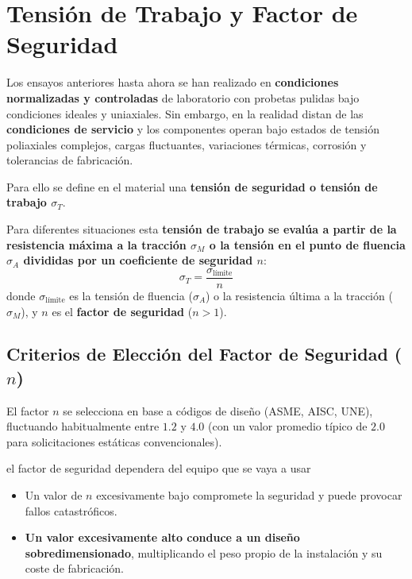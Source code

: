 \section{Tensión de Trabajo y Factor de Seguridad}

Los ensayos anteriores hasta ahora se han realizado en \textbf{condiciones normalizadas y controladas} de laboratorio con probetas pulidas bajo condiciones ideales y uniaxiales. Sin embargo, en la realidad distan de las \textbf{condiciones de servicio} y los componentes operan bajo estados de tensión poliaxiales complejos, cargas fluctuantes, variaciones térmicas, corrosión y tolerancias de fabricación.

Para ello se define en el material una \textbf{tensión de seguridad o tensión de trabajo $\sigma_T$}.

Para diferentes situaciones esta \textbf{tensión de trabajo se evalúa a partir de la resistencia máxima a la tracción $\sigma_M$ o la tensión en el punto de fluencia $\sigma_A$ divididas por un coeficiente de seguridad $n$}:
\begin{equation}
    \sigma_T = \frac{\sigma_{\text{límite}}}{n}
    \label{eq:tension_trabajo}
\end{equation}
donde $\sigma_{\text{límite}}$ es la tensión de fluencia ($\sigma_A$) o la resistencia última a la tracción ($\sigma_M$), y $n$ es el \textbf{factor de seguridad} ($n > 1$).

\subsection{Criterios de Elección del Factor de Seguridad ($n$)}
El factor $n$ se selecciona en base a códigos de diseño (ASME, AISC, UNE), fluctuando habitualmente entre \textbf{$1.2$} y \textbf{$4.0$} (con un valor promedio típico de \textbf{$2.0$} para solicitaciones estáticas convencionales).

el factor de seguridad dependera del equipo que se vaya a usar
\begin{itemize}
    \item Un valor de $n$ excesivamente bajo compromete la seguridad y puede provocar fallos catastróficos.
    \item \textbf{Un valor excesivamente alto conduce a un diseño sobredimensionado}, multiplicando el peso propio de la instalación y su coste de fabricación.
\end{itemize}

